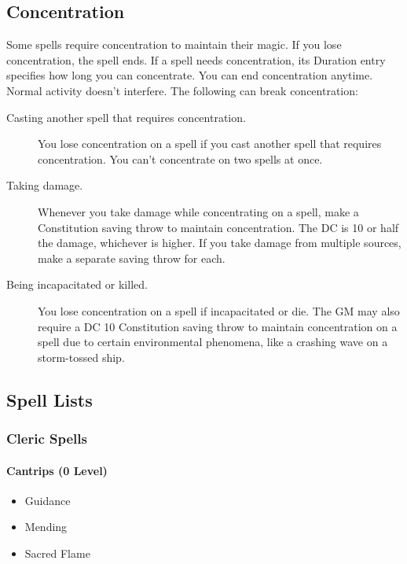 \subsection{Concentration}\label{_concentration}

Some spells require concentration to maintain their magic. If you lose
concentration, the spell ends. If a spell needs concentration, its
Duration entry specifies how long you can concentrate. You can end
concentration anytime. Normal activity doesn't interfere. The following
can break concentration:

\begin{description}
\item[Casting another spell that requires concentration.]
You lose concentration on a spell if you cast another spell that
requires concentration. You can't concentrate on two spells at once.
\item[Taking damage.]
Whenever you take damage while concentrating on a spell, make a
Constitution saving throw to maintain concentration. The DC is 10 or
half the damage, whichever is higher. If you take damage from multiple
sources, make a separate saving throw for each.
\item[Being incapacitated or killed.]
You lose concentration on a spell if incapacitated or die. The GM may
also require a DC 10 Constitution saving throw to maintain concentration
on a spell due to certain environmental phenomena, like a crashing wave
on a storm-tossed ship.
\end{description}

\subsection{Spell Lists}\label{_spell_lists}

\subsubsection{Cleric Spells}\label{spell-list-cleric}

\paragraph{Cantrips (0 Level)}\label{_cantrips_0_level}

\begin{itemize}
\item
  Guidance
\item
  Mending
\item
  Sacred Flame
\end{itemize}

